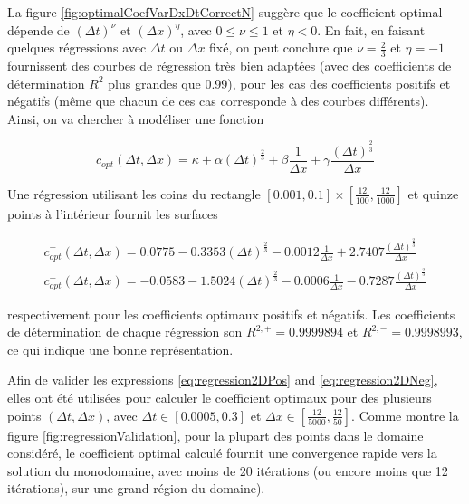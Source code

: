 \indent La figure \ref{fig:optimalCoefVarDxDtCorrectN} suggère que le coefficient optimal dépende de $(\Delta t)^\nu$ et $(\Delta x)^\eta$, avec $0 \leq \nu \leq 1$ et $\eta < 0$. En fait, en faisant quelques régressions avec $\Delta t $ ou $\Delta x$ fixé, on peut conclure que $\nu = \frac{2}{3}$ et $\eta = -1$ fournissent des courbes de régression très bien adaptées (avec des coefficients de détermination $R^2$ plus grandes que 0.99), pour les cas des coefficients positifs et négatifs (même que chacun de ces cas corresponde à des courbes différents). Ainsi, on va chercher à modéliser une fonction

\begin{equation}
	\label{eq:regression2D}
	c_{opt}(\Delta t, \Delta x) = \kappa + \alpha (\Delta t)^{\frac{2}{3}} + \beta \frac{1}{\Delta x} + \gamma   \frac{(\Delta t)^{\frac{2}{3}}}{\Delta x}
\end{equation}

\indent Une régression utilisant les coins du rectangle $[0.001,0.1]\times[\frac{12}{100},\frac{12}{1000}]$ et quinze points à l'intérieur fournit les surfaces 

\begin{gather}
	c_{opt}^+(\Delta t, \Delta x) = 0.0775 -0.3353 (\Delta t)^{\frac{2}{3}} - 0.0012 \frac{1}{\Delta x} + 2.7407   \frac{(\Delta t)^{\frac{2}{3}}}{\Delta x} 	\label{eq:regression2DPos} \\
	c_{opt}^-(\Delta t, \Delta x) = -0.0583 -1.5024 (\Delta t)^{\frac{2}{3}} - 0.0006 \frac{1}{\Delta x} -0.7287  \frac{(\Delta t)^{\frac{2}{3}}}{\Delta x} 	\label{eq:regression2DNeg}
\end{gather}

\noindent respectivement pour les coefficients optimaux positifs et négatifs. Les coefficients de détermination de chaque régression son $R^{2,+} = 0.9999894$ et $R^{2,-} = 0.9998993$, ce qui indique une bonne représentation.

\indent Afin de valider les expressions \eqref{eq:regression2DPos} and \eqref{eq:regression2DNeg}, elles ont été utilisées pour calculer le coefficient optimaux pour des plusieurs points $(\Delta t, \Delta x)$, avec $\Delta t \in [0.0005,0.3]$ et $\Delta x \in \left[ \frac{12}{5000},\frac{12}{50} \right]$. Comme montre la figure \ref{fig:regressionValidation}, pour la plupart des points dans le domaine considéré, le coefficient optimal calculé fournit une convergence rapide vers la solution du monodomaine, avec moins de 20 itérations (ou encore moins que 12 itérations), sur une grand région du domaine).

